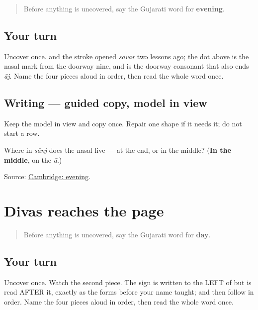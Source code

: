 \label{lesson:GU-C25-saanj}



\begin{quote}
Before anything is uncovered, say the Gujarati word for \textbf{evening}.
\end{quote}

\subsection*{Your turn}
Uncover \textbf{} once. \textbf{} and the \textbf{} stroke opened \emph{savār} two lessons ago; the dot above is the \textbf{} nasal mark from the doorway nine, and \textbf{} is the doorway consonant that also ends \emph{āj}. Name the four pieces aloud in order, then read the whole word once.

\subsection*{Writing — guided copy, model in view}
Keep the model in view and copy \textbf{} once. Repair one shape if it needs it; do not start a row.

\begin{tcolorbox}[breakable,colback=teal!4,colframe=teal!35!black,title={Before you move on}]
Where in \emph{sānj} does the nasal live — at the end, or in the middle? (\textbf{In the middle}, on the \emph{ā}.)

Source: \href{https://dictionary.cambridge.org/dictionary/english-gujarati/evening}{Cambridge: evening}.
\end{tcolorbox}
\section[Practice]{Divas reaches the page}

\label{lesson:GU-C25-divas}



\begin{quote}
Before anything is uncovered, say the Gujarati word for \textbf{day}.
\end{quote}

\subsection*{Your turn}
Uncover \textbf{} once. Watch the second piece. The \textbf{} sign is written to the LEFT of \textbf{} but is read AFTER it, exactly as the forms before your name taught; \textbf{} and \textbf{} then follow in order. Name the four pieces aloud in order, then read the whole word once.

